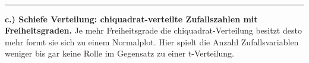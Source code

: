 \documentclass[11pt]{article}
\begin{document}
    \begin{center}
    \end{center}
    { \hspace*{\fill} \\}
    
    \begin{center}
    \end{center}
    { \hspace*{\fill} \\}
    
    \begin{center}
    \end{center}
    { \hspace*{\fill} \\}
    
    \begin{center}
    \end{center}
    { \hspace*{\fill} \\}
    
    \begin{center}
    \end{center}
    { \hspace*{\fill} \\}
    
    \begin{center}
    \end{center}
    { \hspace*{\fill} \\}
    
    \begin{center}\rule{0.5\linewidth}{\linethickness}\end{center}

\textbf{c.) Schiefe Verteilung: chiquadrat-verteilte Zufallszahlen mit
Freiheitsgraden.} Je mehr Freiheitsgrade die chiquadrat-Verteilung
besitzt desto mehr formt sie sich zu einem Normalplot. Hier spielt die
Anzahl Zufallsvariablen weniger bis gar keine Rolle im Gegensatz zu
einer t-Verteilung.
\end{document}
